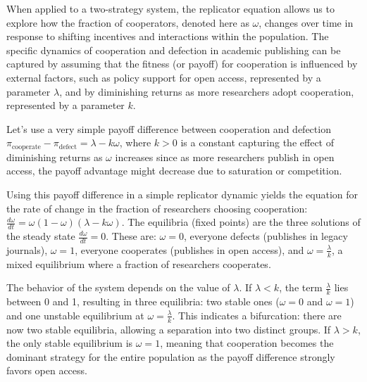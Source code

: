\documentclass[amsfonts, amssymb, prl, superscriptaddress, notitlepage, twocolumn, nofootinbib]{revtex4-2}
\begin{document}
When applied to a two-strategy system, the replicator equation allows us to explore how the fraction of cooperators, denoted here as $\omega$, changes over time in response to shifting incentives and interactions within the population. The specific dynamics of cooperation and defection in academic publishing can be captured by assuming that the fitness (or payoff) for cooperation is influenced by external factors, such as policy support for open access, represented by a parameter $\lambda$, and by diminishing returns as more researchers adopt cooperation, represented by a parameter $k$. 

Let's use a very simple payoff difference between cooperation and defection $\pi_{\text{cooperate}} - \pi_{\text{defect}} = \lambda - k \omega$,
where $k > 0$ is a constant capturing the effect of diminishing returns as $\omega$ increases since as more researchers publish in open access, the payoff advantage might decrease due to saturation or competition.

Using this payoff difference in a simple replicator dynamic yields the equation for the rate of change in the fraction of researchers choosing cooperation: $\frac{d\omega}{dt} = \omega (1 - \omega)(\lambda - k \omega)$. The equilibria (fixed points) are the three solutions of the steady state $\frac{d\omega}{dt} = 0$. These are: $\omega = 0$, everyone defects (publishes in legacy journals), $\omega = 1$, everyone cooperates (publishes in open access), and $\omega = \frac{\lambda}{k}$, a mixed equilibrium where a fraction of researchers cooperates.

The behavior of the system depends on the value of $\lambda$. If $\lambda < k$, the term $\frac{\lambda}{k}$ lies between 0 and 1, resulting in three equilibria: two stable ones ($\omega = 0$ and $\omega = 1$) and one unstable equilibrium at $\omega = \frac{\lambda}{k}$. This indicates a bifurcation: there are now two stable equilibria, allowing a separation into two distinct groups. If $\lambda > k$, the only stable equilibrium is $\omega = 1$, meaning that cooperation becomes the dominant strategy for the entire population as the payoff difference strongly favors open access.
\end{document}
